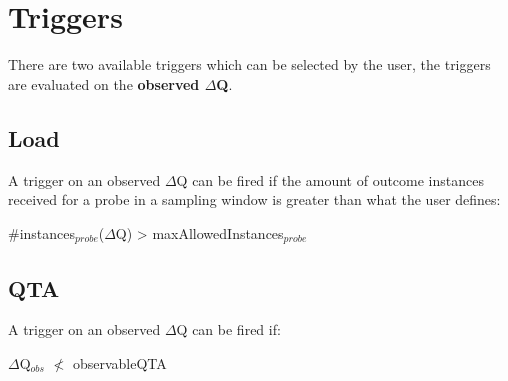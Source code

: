 \section{Triggers}
    There are two available triggers which can be selected by the user, the triggers are evaluated on the \textbf{observed $\Delta$Q}.
    \subsection{Load}
        A trigger on an observed $\Delta$Q can be fired if the amount of outcome instances received for a probe in a sampling window is greater than what the user defines:
    \begin{center}
        \#instances$_{probe}$($\Delta$Q) > maxAllowedInstances$_{probe}$ 
    \end{center}

    \subsection{QTA}
        A trigger on an observed $\Delta$Q can be fired if:
        \begin{center}
            $\Delta$Q$_{obs}$ $\nless$ observableQTA
        \end{center}

